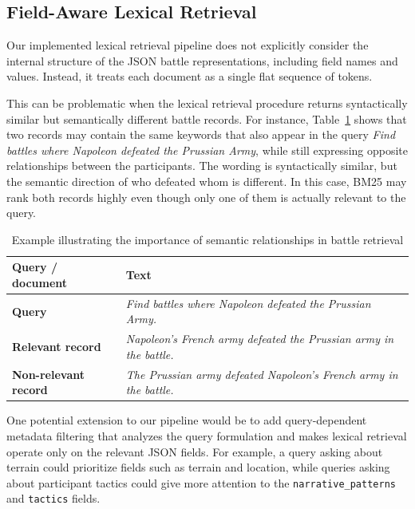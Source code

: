 \subsection{Field-Aware Lexical Retrieval}
Our implemented lexical retrieval pipeline does not explicitly consider the internal structure of the JSON battle representations, including field names and values. Instead, it treats each document as a single flat sequence of tokens.

This can be problematic when the lexical retrieval procedure returns syntactically similar but semantically different battle records. For instance, Table~\ref{tab:semantic_relationship_example} shows that two records may contain the same keywords that also appear in the query \textit{Find battles where Napoleon defeated the Prussian Army}, while still expressing opposite relationships between the participants. The wording is syntactically similar, but the semantic direction of who defeated whom is different. In this case, BM25 may rank both records highly even though only one of them is actually relevant to the query.
\begin{table}[H]
    \centering
    \caption{Example illustrating the importance of semantic relationships in battle retrieval}
    \label{tab:semantic_relationship_example}

    \small
    \renewcommand{\arraystretch}{1.5}
    \setlength{\tabcolsep}{6pt}

    \begin{tabular}{
        >{\raggedright\arraybackslash}p{}
        >{\raggedright\arraybackslash}p{}
    }
        \toprule
        \textbf{Query / document} &
        \textbf{Text} \\
        \midrule

        \textbf{Query} &
        \textit{Find battles where Napoleon defeated the Prussian Army.} \\
        \midrule

        \textbf{Relevant record} &
        \textit{Napoleon's French army defeated the Prussian army in the battle.} \\
        \midrule

        \textbf{Non-relevant record} &
        \textit{The Prussian army defeated Napoleon's French army in the battle.} \\

        \bottomrule
    \end{tabular}
\end{table}
One potential extension to our pipeline would be to add query-dependent metadata filtering that analyzes the query formulation and makes lexical retrieval operate only on the relevant JSON fields. For example, a query asking about terrain could prioritize fields such as terrain and location, while queries asking about participant tactics could give more attention to the \texttt{narrative\_patterns} and \texttt{tactics} fields.

